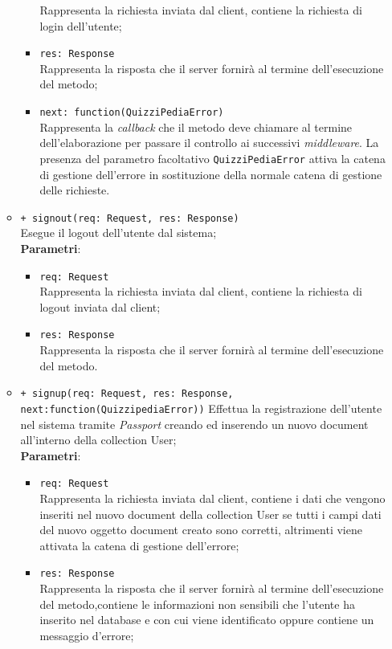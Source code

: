 \begin{itemize}
\begin{itemize}
\begin{itemize}
			Rappresenta la richiesta inviata dal client, contiene la richiesta di login dell’utente;
		  \item
			\texttt{res: Response} \\
			Rappresenta la risposta che il server fornirà al termine dell'esecuzione del metodo;
		  \item
		    \texttt{next: function(QuizziPediaError)} \\
			Rappresenta la \textit{callback} che il metodo deve chiamare al termine dell'elaborazione per passare il controllo ai successivi \textit{middleware}. La presenza del parametro facoltativo \texttt{QuizziPediaError} attiva la catena di gestione dell'errore in sostituzione della normale catena di gestione delle richieste.
		 \end{itemize}
		\item
		\texttt{+ signout(req: Request, res: Response)} \\
		Esegue il logout dell’utente dal sistema;\\
		\textbf{Parametri}:
		 \begin{itemize}
		 \item
			\texttt{req: Request} \\
			Rappresenta la richiesta inviata dal client, contiene la richiesta di logout inviata dal client;
		 \item
			\texttt{res: Response} \\
			Rappresenta la risposta che il server fornirà al termine dell'esecuzione del metodo. 
		 \end{itemize} 
		\item
		\texttt{+ signup(req: Request, res: Response, next:function(QuizzipediaError))}
		Effettua la registrazione dell’utente nel sistema tramite \textit{Passport} creando ed inserendo un nuovo document all’interno della collection User;\\
		\textbf{Parametri}:
		 \begin{itemize}
		 \item
			\texttt{req: Request} \\
			Rappresenta la richiesta inviata dal client, contiene i dati che vengono inseriti nel nuovo document della collection User se tutti i campi dati del nuovo oggetto document creato sono corretti, altrimenti viene attivata la catena di gestione dell'errore;
		 \item
			\texttt{res: Response} \\
			Rappresenta la risposta che il server fornirà al termine dell'esecuzione del metodo,contiene le informazioni non sensibili che l'utente ha inserito nel database e con cui viene identificato oppure contiene un messaggio d'errore;

\end{itemize}
\end{itemize}
\end{itemize}
